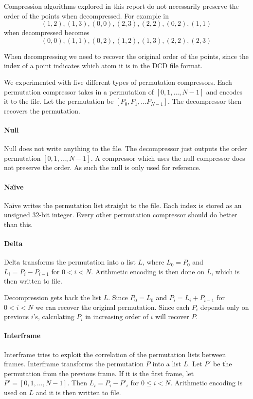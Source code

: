 \documentclass[a4paper]{report}
\begin{document}
Compression algorithms explored in this report do not necessarily preserve the
order of the points when decompressed. For example in \citet{devillers2000gci}
\[ (1, 2), (1, 3), (0, 0), (2, 3), (2, 2), (0, 2), (1, 1) \]
when decompressed becomes
\[ (0, 0), (1, 1), (0, 2), (1, 2), (1, 3), (2, 2), (2, 3) \]

When decompressing we need to recover the original order of the points, since
the index of a point indicates which atom it is in the DCD file format.

We experimented with five different types of permutation compressors. Each
permutation compressor takes in a permutation of $[0,1,\dots,N-1]$ and encodes
it to the file. Let the permutation be $[P_0, P_1, \dots P_{N-1}]$. The
decompressor then recovers the permutation.

\paragraph{Null}
Null does not write anything to the file. The decompressor just outputs the
order permutation $[0,1,\dots,N-1]$. A compressor which uses the null
compressor does not preserve the order. As such the null is only used for
reference.

\paragraph{Na\"{\i}ve}
Na\"{\i}ve writes the permutation list straight to the file. Each index is
stored as an unsigned $32$-bit integer. Every other permutation compressor
should do better than this.

\paragraph{Delta}
Delta transforms the permutation into a list $L$, where $L_0 = P_0$ and $L_i =
P_i - P_{i-1}$ for $0 < i < N$. Arithmetic encoding is then done on $L$, which
is then written to file.

Decompression gets back the list $L$. Since $P_0 = L_0$ and $P_i = L_i +
P_{i-1}$ for $0 < i < N$ we can recover the original permutation. Since each
$P_i$ depends only on previous $i$'s, calculating $P_i$ in increasing order of
$i$ will recover $P$.

\paragraph{Interframe}
Interframe tries to exploit the correlation of the permutation lists between
frames. Interframe transforms the permutation $P$ into a list $L$. Let $P'$ be
the permutation from the previous frame. If it is the first frame, let $P' =
[0,1,\dots,N-1]$. Then $L_i = P_i - P'_i$ for $0 \le i < N$. Arithmetic
encoding is used on $L$ and it is then written to file.
\end{document}
